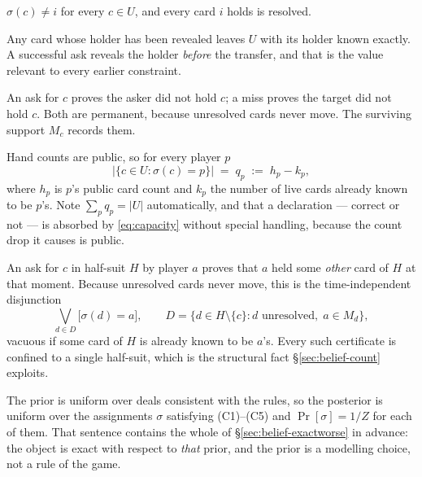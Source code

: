 \begin{description}[style=unboxed,leftmargin=0pt,itemsep=4pt,parsep=0pt]
  \item[(C1) Own hand.] $\sigma(c) \ne i$ for every $c \in U$, and every card $i$
        holds is resolved.
  \item[(C2) Public transfers and correct declarations.] Any card whose holder
        has been revealed leaves $U$ with its holder known exactly. A successful
        ask reveals the holder \emph{before} the transfer, and that is the value
        relevant to every earlier constraint.
  \item[(C3) Exclusions.] An ask for $c$ proves the asker did not hold $c$; a
        miss proves the target did not hold $c$. Both are permanent, because
        unresolved cards never move. The surviving support $M_c$ records them.
  \item[(C4) Capacities.] Hand counts are public, so for every player $p$
        \begin{equation}
          \bigl|\{c \in U : \sigma(c) = p\}\bigr| \;=\; q_p \;:=\; h_p - k_p ,
          \label{eq:capacity}
        \end{equation}
        where $h_p$ is $p$'s public card count and $k_p$ the number of live cards
        already known to be $p$'s. Note $\sum_p q_p = |U|$ automatically, and
        that a declaration --- correct or not --- is absorbed by
        \eqref{eq:capacity} without special handling, because the count drop it
        causes is public.
  \item[(C5) Ask legality.] An ask for $c$ in half-suit $H$ by player $a$ proves
        that $a$ held some \emph{other} card of $H$ at that moment. Because
        unresolved cards never move, this is the time-independent disjunction
        \begin{equation}
          \bigvee_{d \in D} \bigl[\sigma(d) = a\bigr],
          \qquad D = \{d \in H \setminus \{c\} : d \text{ unresolved},\; a \in M_d\},
          \label{eq:disj}
        \end{equation}
        vacuous if some card of $H$ is already known to be $a$'s. Every such
        certificate is confined to a single half-suit, which is the structural
        fact \S\ref{sec:belief-count} exploits.
\end{description}

The prior is uniform over deals consistent with the rules, so the posterior is
uniform over the assignments $\sigma$ satisfying (C1)--(C5) and $\Pr[\sigma] =
1/Z$ for each of them. That sentence contains the whole of
\S\ref{sec:belief-exactworse} in advance: the object is exact with respect to
\emph{that} prior, and the prior is a modelling choice, not a rule of the game.

